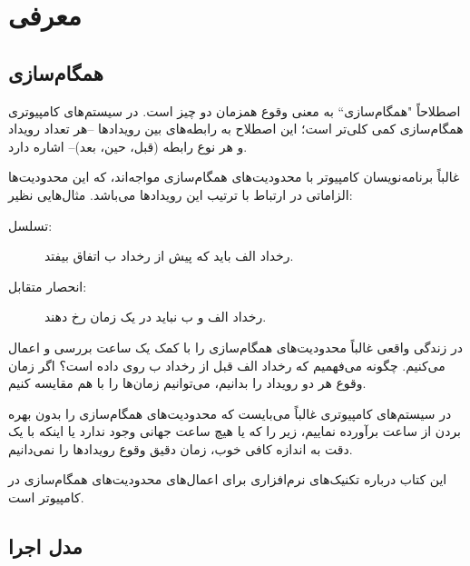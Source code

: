 \documentclass{book}
\newcommand{\clearemptydoublepage}{}%
\newcommand{\myquote}[1]{"#1``}
\begin{document}

\tableofcontents
\clearemptydoublepage

\mainmatter


\chapter{معرفی}

\section{همگام‌‌سازی}
\label{synch}

اصطلاحاً \myquote{همگام‌سازی} به معنی وقوع همزمان دو چیز است. در سیستم‌های کامپیوتری همگام‌سازی کمی کلی‌تر است؛
    این اصطلاح به رابطه‌های بین رویدادها --هر تعداد رویداد و هر نوع رابطه (قبل، حین، بعد)-- اشاره دارد.
    
غالباً برنامه‌نویسان کامپیوتر با محدودیت‌های همگام‌سازی مواجه‌اند، که این محدودیت‌ها الزاماتی در ارتباط با ترتیب این رویدادها می‌باشد.
مثال‌هایی نظیر:

\begin{description}

\item%
    [تسلسل:] رخداد الف باید که پیش از رخداد ب اتفاق بیفتد. 

\item%
[انحصار متقابل:] رخداد الف و ب نباید در یک زمان رخ دهند.

\end{description}
    در زندگی واقعی غالباً محدودیت‌های همگام‌سازی را با کمک یک ساعت بررسی و اعمال می‌کنیم. 
    چگونه می‌‌فهمیم که رخداد الف قبل از رخداد ب روی داده است؟ اگر زمان وقوع هر دو رویداد را بدانیم، می‌توانیم زمان‌ها را با هم مقایسه کنیم.
    
    در سیستم‌های کامپیوتری غالباً می‌بایست که محدودیت‌های همگام‌سازی را بدون بهر‌ه بردن از ساعت بر‌آورده نماییم، 
    زیر را که یا هیچ ساعت جهانی وجود ندارد یا اینکه با یک دقت به اندازه کافی خوب، زمان دقیق وقوع رویدادها را نمی‌دانیم.

    این کتاب درباره تکنیک‌های نرم‌افزاری برای اعمال‌های محدودیت‌های همگام‌سازی در کامپیوتر است.



\section {مدل اجرا}
\end{document}
